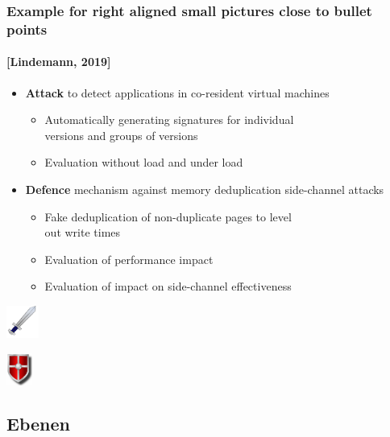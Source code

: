 \documentclass[t,aspectratio=169]{beamer}
\begin{document}
\begin{frame}
	\frametitle{Example for right aligned small pictures close to bullet points}
	\framesubtitle{[Lindemann, 2019]}
	\begin{itemize}
		\item \textbf{Attack} to detect applications in co-resident virtual machines 
		\begin{itemize}
			\item Automatically generating signatures for individual \\ versions and groups of versions
			\item Evaluation without load and under load
		\end{itemize}
		\item \medskip \textbf{Defence} mechanism against memory deduplication side-channel attacks
		\begin{itemize}
			\item Fake deduplication of non-duplicate pages to level \\ out write times
			\item Evaluation of performance impact
			\item Evaluation of impact on side-channel effectiveness
		\end{itemize}
	\end{itemize}
	\raggedleft %
	\par\vspace{-4.5cm} %
	\includegraphics[height=40px]{../pic/sword.pdf} %
	\par\vspace{1.4cm} %
	\includegraphics[height=40px]{../pic/shield.pdf} %
\end{frame}

\subsection{Ebenen} %
\end{document}
